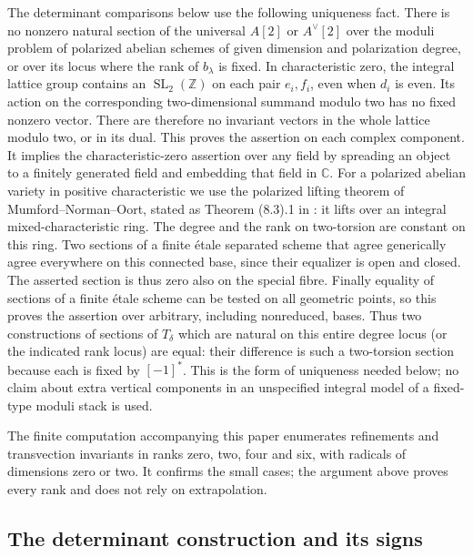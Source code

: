 The determinant comparisons below use the following uniqueness fact.  There is
no nonzero natural section of the universal $A[2]$ or $A^\vee[2]$ over
the moduli problem of polarized abelian schemes of given dimension
and polarization degree, or over its locus where the rank of
$b_\lambda$ is fixed.  In characteristic zero, the integral lattice
group contains an $\operatorname{SL}_2(\mathbb Z)$ on each pair
$e_i,f_i$, even when $d_i$ is even.  Its action on the corresponding
two-dimensional summand modulo two has no fixed nonzero vector.
There are therefore no invariant vectors in the whole lattice modulo
two, or in its dual.  This proves the assertion on each complex
component.  It implies the characteristic-zero assertion over any
field by spreading an object to a finitely generated field and
embedding that field in $\mathbb C$.
For a polarized abelian variety in positive characteristic we use
the polarized lifting theorem of Mumford--Norman--Oort, stated as
Theorem (8.3).1 in \cite[p.~29]{DGJ_Oort2014}: it lifts over an integral
mixed-characteristic ring.  The degree and the rank on two-torsion
are constant on this ring.  Two sections of a finite étale separated
scheme that agree generically agree everywhere on this connected
base, since their equalizer is open and closed.  The asserted section
is thus zero also on the special fibre.  Finally equality of sections
of a finite étale scheme can be tested on all geometric points, so
this proves the assertion over arbitrary, including nonreduced,
bases.  Thus two constructions of sections of $T_\delta$ which are
natural on this entire degree locus (or the indicated rank locus)
are equal: their difference is such a two-torsion section because
each is fixed by $[-1]^*$.  This is the form of uniqueness needed
below; no claim about extra vertical components in an unspecified
integral model of a fixed-type moduli stack is used.

The finite computation accompanying this paper enumerates refinements
and transvection invariants in ranks zero, two, four and six, with
radicals of dimensions zero or two.  It confirms the small cases;
the argument above proves every rank and does not rely on extrapolation.

\subsection{The determinant construction and its signs}
